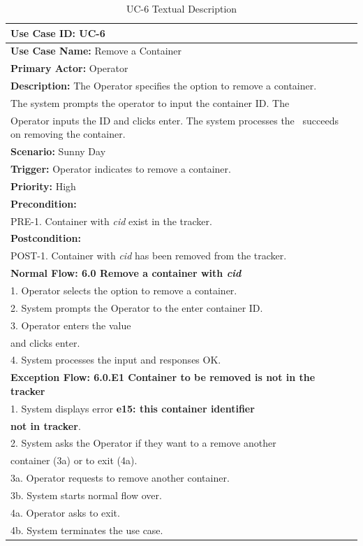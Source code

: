 \begin{table}[h]
\begin{center}
\begin{tabular}{|l|l|}
\hline
\textbf{Use Case ID:} UC-6 \\ \hline
\textbf{Use Case Name:} Remove a Container \\ \hline
\textbf {Primary Actor:} Operator \\ \hline
\textbf{Description:} The Operator specifies the option to remove a container. \\The system prompts the operator to input the container ID. The \\Operator inputs the ID and clicks enter. The system processes the \ succeeds on removing the container. \\ \hline
\textbf{Scenario:} Sunny Day \\ \hline
\textbf{Trigger:} Operator indicates to remove a container.\\ \hline
\textbf{Priority:} High \\ \hline
\textbf{Precondition:}
\\ PRE-1. Container with \emph{cid} exist in the tracker.\\ \hline
\textbf{Postcondition:}
\\ POST-1. Container with \emph{cid} has been removed from the tracker. \\ \hline
\textbf{Normal Flow: 6.0 Remove a container with \emph{cid}}
\\ 1. Operator selects the option to remove a container.
\\ 2. System prompts the Operator to the enter container ID.
\\ 3. Operator enters the value \\and clicks enter.
\\ 4. System processes the input and responses OK.\\ \hline
\textbf{Exception Flow: 6.0.E1 Container to be removed is not in the tracker}
\\ 1. System displays error \textbf{e15: this container identifier} \\ \textbf{not in tracker}.
\\ 2. System asks the Operator if they want to a remove another \\container (3a) or to exit (4a).
\\ 3a. Operator requests to remove another container.
\\ 3b. System starts normal flow over.
\\ 4a. Operator asks to exit.
\\ 4b. System terminates the use case.\\ \hline
\end{tabular}
\end{center}
\caption {UC-6 Textual Description}
\label{tbl:uc6td}
\end{table}

